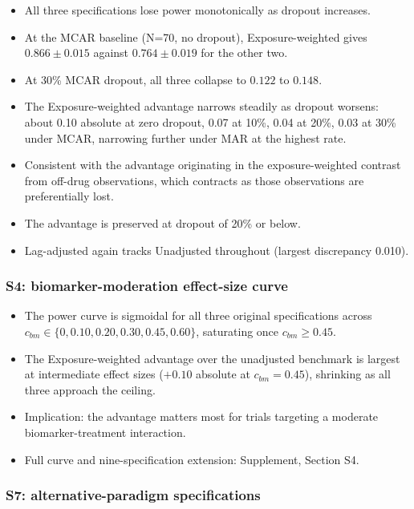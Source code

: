 \documentclass[
  11pt,
]{article}
\providecommand{\tightlist}{%
  \setlength{\itemsep}{0pt}\setlength{\parskip}{0pt}}
\begin{document}
\begin{itemize}
\tightlist
\item
  All three specifications lose power monotonically as dropout
  increases.
\item
  At the MCAR baseline (N=70, no dropout), Exposure-weighted gives
  \(0.866 \pm 0.015\) against \(0.764 \pm 0.019\) for the other two.
\item
  At 30\% MCAR dropout, all three collapse to \(0.122\) to \(0.148\).
\item
  The Exposure-weighted advantage narrows steadily as dropout
  worsens: about 0.10 absolute at zero dropout, 0.07 at 10\%, 0.04 at
  20\%, 0.03 at 30\% under MCAR, narrowing further under MAR at the
  highest rate.
\item
  Consistent with the advantage originating in the exposure-weighted
  contrast from off-drug observations, which contracts as those
  observations are preferentially lost.
\item
  The advantage is preserved at dropout of 20\% or below.
\item
  Lag-adjusted again tracks Unadjusted throughout (largest
  discrepancy 0.010).
\end{itemize}

\subsubsection{S4: biomarker-moderation effect-size curve}\label{s4-biomarker-moderation-effect-size-curve}

\begin{itemize}
\tightlist
\item
  The power curve is sigmoidal for all three original specifications
  across \(c_{bm} \in \{0, 0.10, 0.20, 0.30, 0.45, 0.60\}\), saturating
  once \(c_{bm} \geq 0.45\).
\item
  The Exposure-weighted advantage over the unadjusted benchmark is
  largest at intermediate effect sizes (\(+0.10\) absolute at
  \(c_{bm}=0.45\)), shrinking as all three approach the ceiling.
\item
  Implication: the advantage matters most for trials targeting a
  moderate biomarker-treatment interaction.
\item
  Full curve and nine-specification extension: Supplement, Section
  S4.
\end{itemize}

\subsubsection{S7: alternative-paradigm specifications}\label{s7-alternative-paradigm-specifications}
\end{document}
